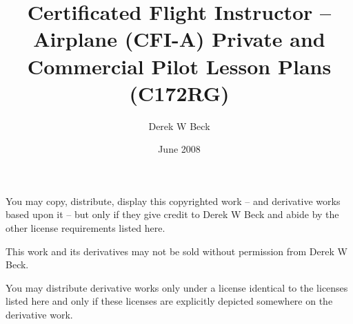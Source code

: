 \documentclass[twoside,openright]{report}
\title{Certificated Flight Instructor – Airplane (CFI-A)
Private and Commercial Pilot Lesson Plans (C172RG)}
\author{Derek W Beck}
\date{June 2008}
\begin{document}
\makeatletter
\begin{titlepage}
  \begin{center}
    \vspace*{1cm}
    \textbf{\@title}

    \vspace*{1cm}
    \@author

    \@date

    \vspace*{2cm}
    \ccby You may copy, distribute, display this copyrighted work -- and
    derivative works based upon it -- but only if they give credit to Derek W
    Beck and abide by the other license requirements listed here.

    \ccnc This work and its derivatives may not be sold without permission from
    Derek W Beck.

    \ccsa You may distribute derivative works only under a license identical to
    the licenses listed here and only if these licenses are explicitly depicted
    somewhere on the derivative work.
  \end{center}
\end{titlepage}

\setcounter{tocdepth}{0}
\tableofcontents





















\end{document}
